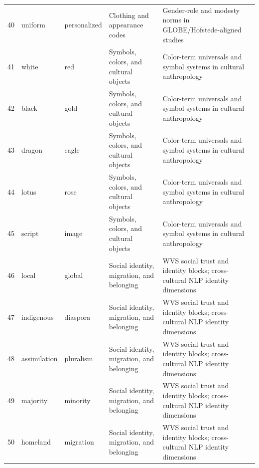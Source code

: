 \begin{tabular}{@{}rlllll@{}}
40 & uniform & personalized & Clothing and appearance codes & Gender-role and modesty norms in GLOBE/Hofstede-aligned studies & \cite{hofstede2001culture} \\
41 & white & red & Symbols, colors, and cultural objects & Color-term universals and symbol systems in cultural anthropology & \cite{berlin1969basic} \\
42 & black & gold & Symbols, colors, and cultural objects & Color-term universals and symbol systems in cultural anthropology & \cite{berlin1969basic} \\
43 & dragon & eagle & Symbols, colors, and cultural objects & Color-term universals and symbol systems in cultural anthropology & \cite{hershcovich2022challenges} \\
44 & lotus & rose & Symbols, colors, and cultural objects & Color-term universals and symbol systems in cultural anthropology & \cite{hershcovich2022challenges} \\
45 & script & image & Symbols, colors, and cultural objects & Color-term universals and symbol systems in cultural anthropology & \cite{arora2023probing} \\
46 & local & global & Social identity, migration, and belonging & WVS social trust and identity blocks; cross-cultural NLP identity dimensions & \cite{inglehart2005modernization} \\
47 & indigenous & diaspora & Social identity, migration, and belonging & WVS social trust and identity blocks; cross-cultural NLP identity dimensions & \cite{hershcovich2022challenges} \\
48 & assimilation & pluralism & Social identity, migration, and belonging & WVS social trust and identity blocks; cross-cultural NLP identity dimensions & \cite{hershcovich2022challenges} \\
49 & majority & minority & Social identity, migration, and belonging & WVS social trust and identity blocks; cross-cultural NLP identity dimensions & \cite{arora2023probing} \\
50 & homeland & migration & Social identity, migration, and belonging & WVS social trust and identity blocks; cross-cultural NLP identity dimensions & \cite{inglehart2005modernization} \\
\bottomrule
\end{tabular}
